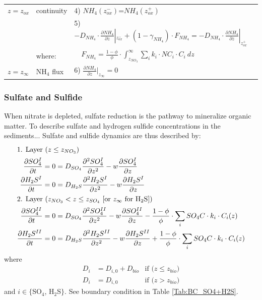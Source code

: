 \documentclass[gmd, manuscript]{copernicus}
\begin{document}
\begin{table}[tbp]
\begin{tabular}{ |l| l| l|}
$z=z_{ox}$& continuity& 4) $NH_4(z_{ox}^-)$=$NH_4(z_{ox}^+)$\\
               && 5) $-D_{NH_4} \cdot \frac{\partial NH_4}{\partial z}|_{z_{ox}^-} + (1-\gamma_{NH_4})\cdot F_{NH_4}=-D_{NH_4} \cdot \frac{\partial NH_4}{\partial z}|_{z_{ox}^+}$\\
&where: & $\quad F_{NH_4}=\frac{1-\phi}{\phi} \cdot \int_{z_{NO_3}}^{\infty}  \sum_i k_i \cdot NC_i \cdot C_i\ dz$ \\          
$z=z_{\infty}$& NH$_4$ flux & 6) $\frac{\partial NH_4}{\partial z}|_{z_\infty}=0$\\
\hline    
\end{tabular}
\label{Tab:BC_NO3+NH4}
\end{table}
\subsubsection{Sulfate and Sulfide}
When nitrate is depleted, sulfate reduction is the pathway to mineralize organic matter.  To describe sulfate and hydrogen sulfide concentrations in the sediments...
Sulfate and sulfide dynamics are thus described by:
\begin{align}
\intertext{1. Layer ($z \leq z_{NO_3}$)}
 \frac{\partial SO_4^I}{\partial t} &= 0 = D_{SO_4} \frac{\partial^2SO_4^I }{\partial z^2} - w\frac{\partial SO_4^I }{\partial z} \label{eq:SO4_ODE1_L1}\\ %
 \frac{\partial H_2S^I}{\partial t} &= 0 = D_{H_2S} \frac{\partial^2H_2S^I }{\partial z^2} - w\frac{\partial H_2S^I }{\partial z}\label{eq:H2S_ODE1_L1}\\
 \intertext{2. Layer ($z_{NO_3} < z \leq z_{SO_4}$ [or $z_\infty$ for H$_2$S])} 
\frac{\partial SO_4^{II}}{\partial t} &= 0 = D_{SO_4} \frac{\partial^2SO_4^{II} }{\partial z^2} - w\frac{\partial SO_4^{II} }{\partial z} - \frac{1-\phi}{\phi} \cdot \sum_i SO_4C \cdot k_i \cdot C_{i}(z) \label{eq:NO3_ODE1_L2}\\
\frac{\partial H_2S^{II}}{\partial t} &= 0 = D_{H_2S} \frac{\partial^2H_2S^{II} }{\partial z^2} - w\frac{\partial H_2S^{II} }{\partial z} + \frac{1-\phi}{\phi} \cdot \sum_i SO_4C  \cdot k_i \cdot C_{i}(z)\label{eq:NH4_ODE1_L2}
\end{align}
where
\begin{align}
 D_{i}&=D_{i, 0}+D_{bio} &\text{if ($z\leq z_{bio}$)}\\
 D_{i}&=D_{i, 0}                &\text{if ($z > z_{bio}$)} 
\end{align} 
and $i \in \{$SO$_4$, H$_2$S$\}$. 
See boundary condition in Table \ref{Tab:BC_SO4+H2S}.
\end{document}
